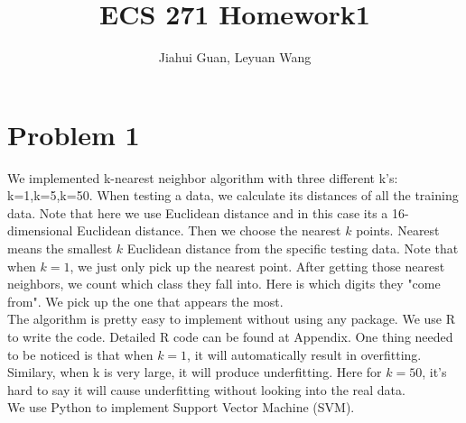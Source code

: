 \documentclass{article}
\title{ECS 271 Homework1}
\date{\vspace{-5ex}}
\begin{document}
\author{Jiahui Guan, Leyuan Wang}
\maketitle


\section{Problem 1} 
We implemented k-nearest neighbor algorithm with three different k's: k=1,k=5,k=50. When testing a data, we calculate its distances of all the training data. Note that here we use Euclidean distance and in this case its a 16-dimensional Euclidean distance. Then we choose the nearest $k$ points. Nearest means the smallest $k$ Euclidean distance from the specific testing data. Note that when $k=1$, we just only pick up the nearest point. After getting those nearest neighbors, we count which class they fall into. Here is which digits they "come from". We pick up the one that appears the most. \\

The algorithm is pretty easy to implement without using any package. We use R to write the code. Detailed R code can be found at Appendix. One thing needed to be noticed is that when $k=1$, it will automatically result in overfitting. Similary, when k is very large, it will produce underfitting. Here for $k=50$, it's hard to say it will cause underfitting without looking into the real data.\\

We use Python to implement Support Vector Machine (SVM).
\end{document}
